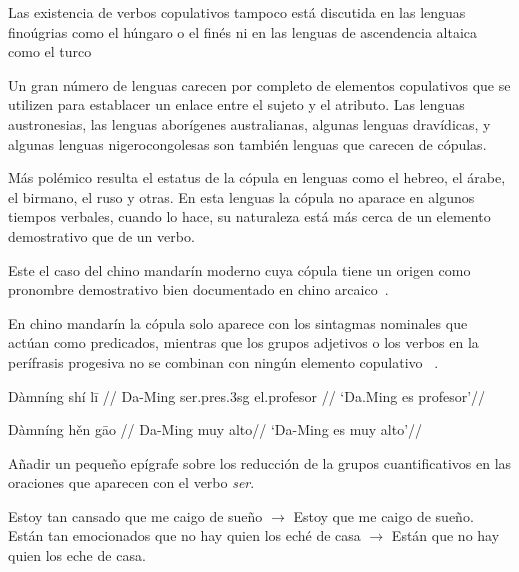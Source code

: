 Las existencia de verbos copulativos tampoco está discutida en las lenguas finoúgrias como el húngaro o el finés ni en las lenguas de ascendencia altaica como el turco


Un gran número de lenguas carecen por completo de elementos copulativos que se utilizen para establacer un enlace entre el sujeto y el atributo. Las lenguas austronesias, las lenguas aborígenes australianas, algunas lenguas dravídicas, y algunas lenguas nigerocongolesas son también lenguas que carecen de cópulas.

Más polémico resulta el estatus de la cópula en lenguas como el hebreo, el árabe, el birmano, el ruso y otras. En esta lenguas la cópula no aparace en algunos tiempos verbales, cuando lo hace, su naturaleza está más cerca de un elemento demostrativo que de un verbo. 


Este el caso del chino mandarín moderno cuya cópula tiene un origen como pronombre demostrativo bien documentado en chino arcaico~\parencites{Li1977Mechanismdevelopmentcopula}{Lohndal2009Copula-cycle}{Gelderen2011The-Pronominal}.

 En chino mandarín la cópula solo aparece con los sintagmas nominales que actúan como predicados, mientras que los grupos adjetivos o los verbos en la perífrasis progesiva no se combinan con ningún elemento copulativo ~\parencites{Pustet2003Copulas-univer}.
 
 
 \ex[glspace=!1em,everygla={},everyglb={},aboveglbskip=-.2ex]
\begingl
\gla Dàmníng shí l\={i} //
\glb Da-Ming ser.{\sc pres}.{\sc 3sg} el.profesor  //
\glft ‘Da.Ming es profesor’//
\endgl
\xe
 
\ex[glspace=!1em,everygla={},everyglb={},aboveglbskip=-.2ex]
\begingl
\gla Dàmníng h\v{e}n g\={a}o //
\glb Da-Ming {} muy alto//
\glft ‘Da-Ming es muy alto’//
\endgl
\xe
 
  








Añadir un pequeño epígrafe sobre los reducción de la grupos cuantificativos en las oraciones que aparecen con el verbo \textit{ser}.

\pex[*]
\a	Estoy tan cansado que me caigo de sueño $\longrightarrow$  Estoy que me caigo de sueño.
\a	Están tan emocionados que no hay quien los eché de casa $\longrightarrow$  Están que no hay quien los eche de casa.
\xe


